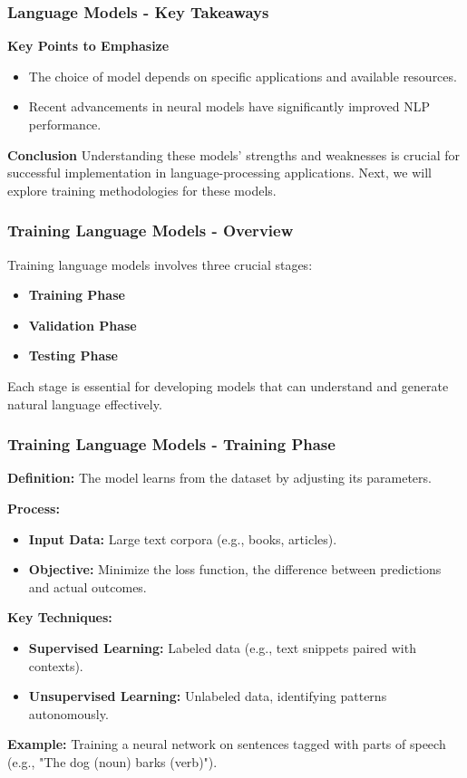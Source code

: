 \documentclass[aspectratio=169]{beamer}
\begin{document}
\begin{frame}[fragile]
    \frametitle{Language Models - Key Takeaways}
    \textbf{Key Points to Emphasize}
    \begin{itemize}
        \item The choice of model depends on specific applications and available resources.
        \item Recent advancements in neural models have significantly improved NLP performance.
    \end{itemize}
    
    \textbf{Conclusion}
    Understanding these models' strengths and weaknesses is crucial for successful implementation in language-processing applications. Next, we will explore training methodologies for these models.
\end{frame}

\begin{frame}[fragile]
    \frametitle{Training Language Models - Overview}
    Training language models involves three crucial stages:
    
    \begin{itemize}
        \item \textbf{Training Phase}
        \item \textbf{Validation Phase}
        \item \textbf{Testing Phase}
    \end{itemize}
    
    Each stage is essential for developing models that can understand and generate natural language effectively.
\end{frame}

\begin{frame}[fragile]
    \frametitle{Training Language Models - Training Phase}
    
    \textbf{Definition:} The model learns from the dataset by adjusting its parameters.
    
    \textbf{Process:}
    \begin{itemize}
        \item \textbf{Input Data:} Large text corpora (e.g., books, articles).
        \item \textbf{Objective:} Minimize the loss function, the difference between predictions and actual outcomes.
    \end{itemize}
    
    \textbf{Key Techniques:}
    \begin{itemize}
        \item \textbf{Supervised Learning:} Labeled data (e.g., text snippets paired with contexts).
        \item \textbf{Unsupervised Learning:} Unlabeled data, identifying patterns autonomously.
    \end{itemize}
    
    \textbf{Example:} Training a neural network on sentences tagged with parts of speech (e.g., "The dog (noun) barks (verb)").
\end{frame}
\end{document}
